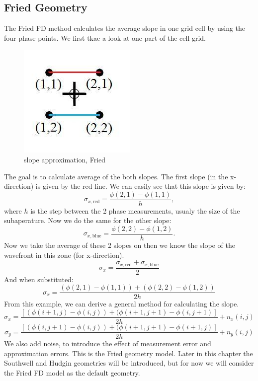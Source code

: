 \documentclass{article}
\begin{document}
\subsection{Fried Geometry}
The Fried FD method calculates the average slope in one grid cell by using the four phase points. We first tkae a look at one part of the cell grid.
\begin{figure}[h!]
  \centering
  \includegraphics[scale=0.6]{figures/fried}
  \caption{slope approximation, Fried}
\end{figure}
\newpage
\noindent The goal is to calculate average of the both slopes. The first slope (in the x-direction) is given by the red line. We can easily see that this slope is given by:
$$ \sigma_{x,\text{red}} = \frac{\phi(2,1) - \phi(1,1)}{h}, $$
where $h$ is the step between the 2 phase measurements, usualy the size of the subaperature.
Now we do the same for the other slope:
$$ \sigma_{x,\text{blue}} = \frac{\phi(2,2) - \phi(1,2)}{h}. $$
Now we take the average of these 2 slopes on then we know the slope of the wavefront in this zone (for x-direction).
$$ \sigma_x = \frac{\sigma_{x,\text{red}}+\sigma_{x,\text{blue}}}{2}$$
And when substituted:
$$ \sigma_x = \frac{(\phi(2,1) - \phi(1,1))+(\phi(2,2) - \phi(1,2))}{2h}$$
From this example, we can derive a general method for calculating the slope. 
$$ \sigma_x = \frac{[(\phi(i+1,j)-\phi(i,j))+(\phi(i+1,j+1)-\phi(i,j+1)]}{2h} + n_x(i,j)$$
$$ \sigma_y = \frac{[(\phi(i,j+1)-\phi(i,j))+(\phi(i+1,j+1)-\phi(i+1,j)]}{2h} + n_y(i,j)$$
We also add noise, to introduce the effect of measurement error and approximation errors.
This is the Fried geometry model. Later in this chapter the Southwell and Hudgin geometries will be introduced, but for now we will consider the Fried FD model as the default geometry.
\end{document}
